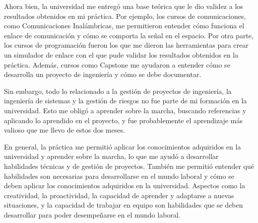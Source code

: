Ahora bien, la universidad me entregó una base teórica que le dio validez a los resultados obtenidos en mi práctica. Por ejemplo, los cursos de comunicaciones, como Comunicaciones Inalámbricas, me permitieron entender cómo funciona el enlace de comunicación y cómo se comporta la señal en el espacio. Por otra parte, los cursos de programación fueron los que me dieron las herramientas para crear un simulador de enlace con el que pude validar los resultados obtenidos en la práctica. Además, cursos como Capstone me ayudaron a entender cómo se desarrolla un proyecto de ingeniería y cómo se debe documentar.

Sin embargo, todo lo relacionado a la gestión de proyectos de ingeniería, la ingeniería de sistemas y la gestión de riesgos no fue parte de mi formación en la universidad. Esto me obligó a aprender sobre la marcha, buscando referencias y aplicando lo aprendido en el proyecto, y fue probablemente el aprendizaje más valioso que me llevo de estos dos meses.

En general, la práctica me permitió aplicar los conocimientos adquiridos en la universidad y aprender sobre la marcha, lo que me ayudó a desarrollar habilidades técnicas y de gestión de proyectos. También me permitió entender qué habilidades son necesarias para desarrollarse en el mundo laboral y cómo se deben aplicar los conocimientos adquiridos en la universidad. Aspectos como la creatividad, la proactividad, la capacidad de aprender y adaptarse a nuevas situaciones, y la capacidad de trabajar en equipo son habilidades que se deben desarrollar para poder desempeñarse en el mundo laboral.

\newpage

